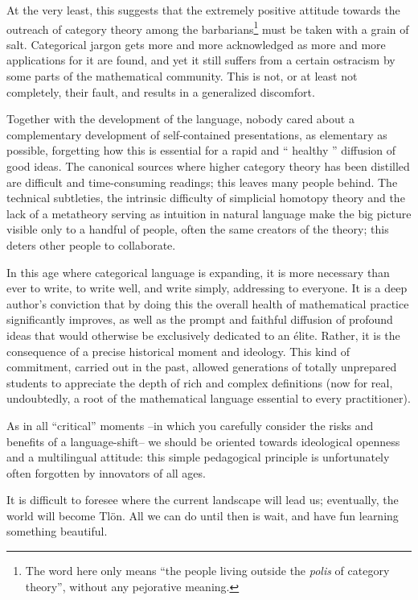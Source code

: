 At the very least, this suggests that the extremely positive attitude towards the outreach of category theory among the barbarians\footnote{The word here only means ``the people living outside the \emph{polis} of category theory'', without any pejorative meaning.} must be taken with a grain of salt. Categorical jargon gets more and more acknowledged as more and more applications for it are found, and yet it still suffers from a certain ostracism by some parts of the mathematical community. This is not, or at least not completely, their fault, and results in a generalized discomfort. 

Together with the development of the language, nobody cared about a complementary development of self-contained presentations, as elementary as possible, forgetting how this is essential for a rapid and `` healthy '' diffusion of good ideas. The canonical sources where higher category theory has been distilled are difficult and time-consuming readings; this leaves many people behind. The technical subtleties, the intrinsic difficulty of simplicial homotopy theory and the lack of a metatheory serving as intuition in natural language make the big picture visible only to a handful of people, often the same creators of the theory; this deters other people to collaborate. 

In this age where categorical language is expanding, it is more necessary than ever to write, to write well, and write simply, addressing to everyone. It is a deep author's conviction that by doing this the overall health of mathematical practice significantly improves, as well as the prompt and faithful diffusion of profound ideas that would otherwise be exclusively dedicated to an élite. Rather, it is the consequence of a precise historical moment and ideology. This kind of commitment, carried out in the past, allowed generations of totally unprepared students to appreciate the depth of rich and complex definitions (now for real, undoubtedly, a root of the mathematical language essential to every practitioner).

As in all ``critical'' moments --in which you carefully consider the risks and benefits of a language-shift-- we should be oriented towards ideological openness and a multilingual attitude: this simple pedagogical principle is unfortunately often forgotten by innovators of all ages.

It is difficult to foresee where the current landscape will lead us; eventually, the world will become Tl\"{o}n. All we can do until then is wait, and have fun learning something beautiful. 
